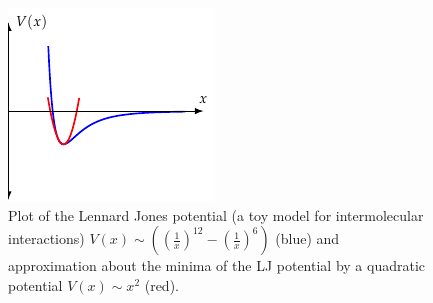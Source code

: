 \begin{figure}[htbp]
    \centering
    \includegraphics{Images/fig-LJpotential.pdf}

    \caption{Plot of the Lennard Jones potential (a toy model for intermolecular interactions) $V(x) \sim \left(\left(\frac{1}{x}\right)^{12} - \left(\frac{1}{x}\right)^{6}\right)$ (blue) and approximation about the minima of the LJ potential by a quadratic potential $V(x) \sim x^2$ (red).}
    \label{fig-LJpotential}
\end{figure}

